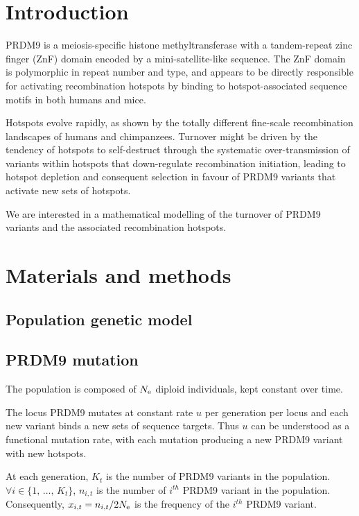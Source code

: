 \documentclass{article}
\begin{document}
\section*{Introduction}
PRDM9 is a meiosis-specific histone methyltransferase with a tandem-repeat zinc finger (ZnF) domain encoded by a mini-satellite-like sequence. The ZnF domain is polymorphic in repeat number and type, and appears to be directly responsible for activating recombination hotspots by binding to hotspot-associated sequence motifs in both humans and mice.

Hotspots evolve rapidly, as shown by the totally different fine-scale recombination landscapes of humans and chimpanzees.
Turnover might be driven by the tendency of hotspots to self-destruct through the systematic over-transmission of variants within hotspots that down-regulate recombination initiation, leading to hotspot depletion and consequent 
selection in favour of PRDM9 variants that activate new sets of hotspots.

We are interested in a mathematical modelling of the turnover of PRDM9 variants and the associated recombination hotspots.

\section*{Materials and methods}

\subsection*{Population genetic model}

\subsection*{PRDM9 mutation}

The population is composed of $N_\mathrm{e}$ diploid individuals, kept constant over time.

The locus PRDM9 mutates at constant rate $u$ per generation per locus and each new variant binds a new sets of sequence targets. Thus $u$ can be understood as a functional mutation rate, with each mutation producing a new PRDM9 variant with new hotspots.

At each generation, $K_{t}$ is the number of PRDM9 variants in the population. $\forall i \in \{ 1, \, \dots, \, K_{t} \}$, $n_{i,t}$ is the number of $i^{th}$ PRDM9 variant in the population. Consequently, $x_{i,t} = n_{i,t} / 2 N_\mathrm{e}$ is the frequency of the $i^{th}$ PRDM9 variant.
\end{document}
